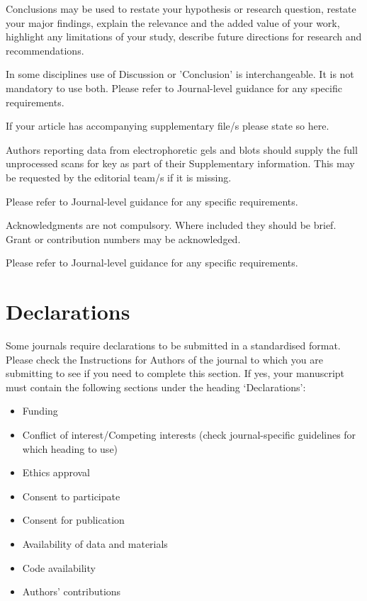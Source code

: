 \documentclass[sn-standardnature]{sn-jnl}%
\theoremstyle{thmstyleone}%
\theoremstyle{thmstyletwo}%
\theoremstyle{thmstylethree}%
\begin{document}
Conclusions may be used to restate your hypothesis or research question, restate your major findings, explain the relevance and the added value of your work, highlight any limitations of your study, describe future directions for research and recommendations. 

In some disciplines use of Discussion or 'Conclusion' is interchangeable. It is not mandatory to use both. Please refer to Journal-level guidance for any specific requirements. 

\backmatter


If your article has accompanying supplementary file/s please state so here. 

Authors reporting data from electrophoretic gels and blots should supply the full unprocessed scans for key as part of their Supplementary information. This may be requested by the editorial team/s if it is missing.

Please refer to Journal-level guidance for any specific requirements.


Acknowledgments are not compulsory. Where included they should be brief. Grant or contribution numbers may be acknowledged.

Please refer to Journal-level guidance for any specific requirements.

\section*{Declarations}

Some journals require declarations to be submitted in a standardised format. Please check the Instructions for Authors of the journal to which you are submitting to see if you need to complete this section. If yes, your manuscript must contain the following sections under the heading `Declarations':

\begin{itemize}
\item Funding
\item Conflict of interest/Competing interests (check journal-specific guidelines for which heading to use)
\item Ethics approval 
\item Consent to participate
\item Consent for publication
\item Availability of data and materials
\item Code availability 
\item Authors' contributions
\end{itemize}
\end{document}
